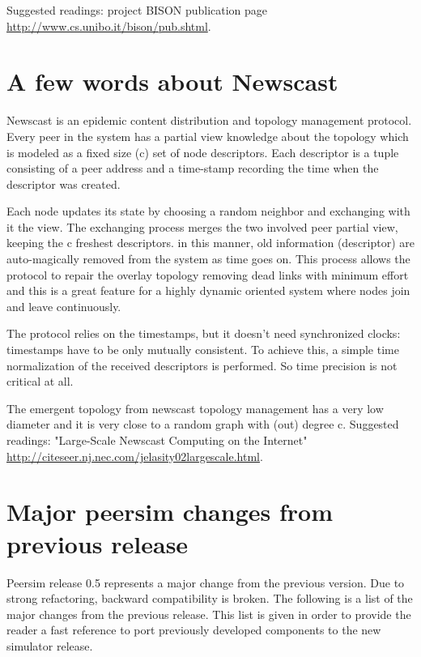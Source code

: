 \documentclass[a4paper,11pt]{article}
\begin{document}
Suggested readings: project BISON publication page \url{http://www.cs.unibo.it/bison/pub.shtml}.


\section{\label{sec:Appendix-B-newscast}A few words about Newscast}

Newscast is an epidemic content distribution and topology management
protocol. Every peer in the system has a partial view knowledge about
the topology which is modeled as a fixed size (c) set of node descriptors.
Each descriptor is a tuple consisting of a peer address and a time-stamp
recording the time when the descriptor was created.

Each node updates its state by choosing a random neighbor and exchanging
with it the view. The exchanging process merges the two involved peer
partial view, keeping the c freshest descriptors. in this manner,
old information (descriptor) are auto-magically removed from the system
as time goes on. This process allows the protocol to repair the overlay
topology removing dead links with minimum effort and this is a great
feature for a highly dynamic oriented system where nodes join and
leave continuously. 

The protocol relies on the timestamps, but it doesn't need synchronized
clocks: timestamps have to be only mutually consistent. To achieve
this, a simple time normalization of the received descriptors is performed.
So time precision is not critical at all. 

The emergent topology from newscast topology management has a very
low diameter and it is very close to a random graph with (out) degree
c. Suggested readings: "Large-Scale Newscast Computing on the Internet" \url{http://citeseer.nj.nec.com/jelasity02largescale.html}.

\section{\label{sec:Appendix-C-changes} Major peersim changes from
  previous release}

Peersim release 0.5 represents a major change from the previous
version. Due to strong refactoring, backward compatibility is broken. 
The following is a list of the major changes from the previous
release. This list is given in order to provide the reader a fast reference to
port previously developed components to the new simulator release.
\end{document}
